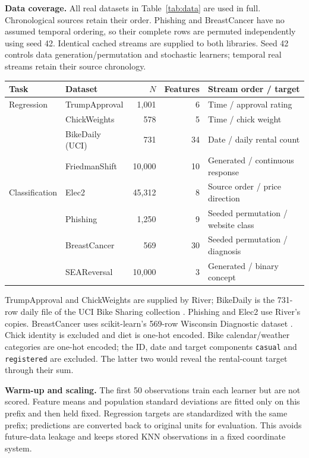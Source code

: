 \documentclass[10pt,a4paper]{article}
\begin{document}
\textbf{Data coverage.} All real datasets in Table~\ref{tab:data} are used in full. Chronological sources retain their order. Phishing and BreastCancer have no assumed temporal ordering, so their complete rows are permuted independently using seed 42. Identical cached streams are supplied to both libraries. Seed 42 controls data generation/permutation and stochastic learners; temporal real streams retain their source chronology.
\begin{center}\label{tab:data}
\small\begin{tabular}{llrrl}\toprule
Task & Dataset & $N$ & Features & Stream order / target\\\midrule
Regression & TrumpApproval & 1,001 & 6 & Time / approval rating\\
& ChickWeights & 578 & 5 & Time / chick weight\\
& BikeDaily (UCI) & 731 & 34 & Date / daily rental count\\
& FriedmanShift & 10,000 & 10 & Generated / continuous response\\\midrule
Classification & Elec2 & 45,312 & 8 & Source order / price direction\\
& Phishing & 1,250 & 9 & Seeded permutation / website class\\
& BreastCancer & 569 & 30 & Seeded permutation / diagnosis\\
& SEAReversal & 10,000 & 3 & Generated / binary concept\\\bottomrule
\end{tabular}\end{center}
TrumpApproval and ChickWeights are supplied by River; BikeDaily is the 731-row daily file of the UCI Bike Sharing collection \cite{datasets,bike}. Phishing and Elec2 use River's copies. BreastCancer uses scikit-learn's 569-row Wisconsin Diagnostic dataset \cite{sklearn}. Chick identity is excluded and diet is one-hot encoded. Bike calendar/weather categories are one-hot encoded; the ID, date and target components \texttt{casual} and \texttt{registered} are excluded. The latter two would reveal the rental-count target through their sum.

\textbf{Warm-up and scaling.} The first 50 observations train each learner but are not scored. Feature means and population standard deviations are fitted only on this prefix and then held fixed. Regression targets are standardized with the same prefix; predictions are converted back to original units for evaluation. This avoids future-data leakage and keeps stored KNN observations in a fixed coordinate system.
\end{document}
